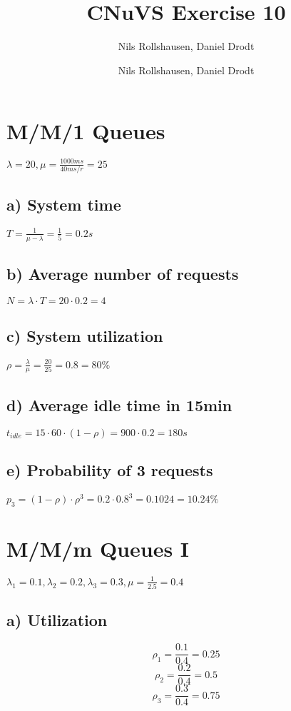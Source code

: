 \documentclass[a4paper, 11 pt, article, accentcolor=tud7b]{tudreport}
\title{CNuVS Exercise 10}
\author{Nils Rollshausen, Daniel Drodt}
\subtitle{Nils Rollshausen, Daniel Drodt}
\begin{document}
	\maketitle
	\section{M/M/1 Queues}
	$\lambda = 20, \mu = \frac{1000ms}{40ms/r} = 25$
	\subsection*{a) System time}
	$T = \frac{1}{\mu - \lambda} = \frac{1}{5} = 0.2s$
	
	\subsection*{b) Average number of requests}
	$N = \lambda \cdot T = 20 \cdot 0.2 = 4$
	
	\subsection*{c) System utilization}
	$\rho = \frac{\lambda}{\mu} = \frac{20}{25} = 0.8 = 80\%$
	
	\subsection*{d) Average idle time in 15min}
	$t_{idle} = 15 \cdot 60 \cdot (1 - \rho) = 900 \cdot 0.2 = 180s$
	
	\subsection*{e) Probability of 3 requests}
	$p_{3} = (1 - \rho) \cdot \rho^3 = 0.2 \cdot 0.8^3 = 0.1024 = 10.24\%$
	
	\section{M/M/m Queues I}
	
	$\lambda_{1} = 0.1, \lambda_{2} = 0.2, \lambda_{3} = 0.3, \mu = \frac{1}{2.5} = 0.4$
	
	\subsection*{a) Utilization}
	$$\rho_{1} = \frac{0.1}{0.4} = 0.25$$ 
	$$\rho_{2} = \frac{0.2}{0.4} = 0.5 $$
	$$\rho_{3} = \frac{0.3}{0.4} = 0.75$$
	
\end{document}
